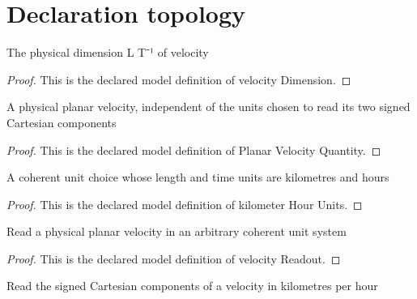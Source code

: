 \section{Declaration topology}
\begin{definition}
  \label{def:physics:phyx-mini-0797:phyxminiproblems-problemphyxmini0797-velocitydimension}
  The physical dimension L T⁻¹ of velocity
\end{definition}
\begin{proof}
  This is the declared model definition of velocity Dimension.
\end{proof}
\begin{definition}
  \label{def:physics:phyx-mini-0797:phyxminiproblems-problemphyxmini0797-planarvelocityquantity}
  A physical planar velocity, independent of the units chosen to read its two signed Cartesian components
\end{definition}
\begin{proof}
  This is the declared model definition of Planar Velocity Quantity.
\end{proof}
\begin{definition}
  \label{def:physics:phyx-mini-0797:phyxminiproblems-problemphyxmini0797-kilometerhourunits}
  A coherent unit choice whose length and time units are kilometres and hours
\end{definition}
\begin{proof}
  This is the declared model definition of kilometer Hour Units.
\end{proof}
\begin{definition}
  \label{def:physics:phyx-mini-0797:phyxminiproblems-problemphyxmini0797-velocityreadout}
  Read a physical planar velocity in an arbitrary coherent unit system
\end{definition}
\begin{proof}
  This is the declared model definition of velocity Readout.
\end{proof}
\begin{definition}
  \label{def:physics:phyx-mini-0797:phyxminiproblems-problemphyxmini0797-velocityinkilometersperhour}
  Read the signed Cartesian components of a velocity in kilometres per hour
\end{definition}
